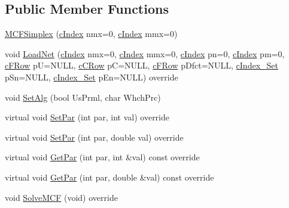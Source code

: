 \subsection*{Public Member Functions}
\begin{DoxyCompactItemize}
\item 
\mbox{\hyperlink{class_m_c_f_simplex_abff4293726e37f6e979cf7c156514e0f}{M\+C\+F\+Simplex}} (\mbox{\hyperlink{class_m_c_f_class_a76aaabb20535c51a2752b93f6c38fe54}{c\+Index}} nmx=0, \mbox{\hyperlink{class_m_c_f_class_a76aaabb20535c51a2752b93f6c38fe54}{c\+Index}} mmx=0)
\item 
void \mbox{\hyperlink{class_m_c_f_simplex_ac270d18d58fd6fe88164cde1f4c80aff}{Load\+Net}} (\mbox{\hyperlink{class_m_c_f_class_a76aaabb20535c51a2752b93f6c38fe54}{c\+Index}} nmx=0, \mbox{\hyperlink{class_m_c_f_class_a76aaabb20535c51a2752b93f6c38fe54}{c\+Index}} mmx=0, \mbox{\hyperlink{class_m_c_f_class_a76aaabb20535c51a2752b93f6c38fe54}{c\+Index}} pn=0, \mbox{\hyperlink{class_m_c_f_class_a76aaabb20535c51a2752b93f6c38fe54}{c\+Index}} pm=0, \mbox{\hyperlink{class_m_c_f_class_ad325f3193dbba0ddef1da4e72d29eda6}{c\+F\+Row}} pU=N\+U\+LL, \mbox{\hyperlink{class_m_c_f_class_ab700102e9ba8bb6015be6818d4e99097}{c\+C\+Row}} pC=N\+U\+LL, \mbox{\hyperlink{class_m_c_f_class_ad325f3193dbba0ddef1da4e72d29eda6}{c\+F\+Row}} p\+Dfct=N\+U\+LL, \mbox{\hyperlink{class_m_c_f_class_a81575b2d4e4d5636b17170432150ae69}{c\+Index\+\_\+\+Set}} p\+Sn=N\+U\+LL, \mbox{\hyperlink{class_m_c_f_class_a81575b2d4e4d5636b17170432150ae69}{c\+Index\+\_\+\+Set}} p\+En=N\+U\+LL) override
\item 
void \mbox{\hyperlink{class_m_c_f_simplex_a1d66ff221305ac6731b32eaec7625a74}{Set\+Alg}} (bool Us\+Prml, char Whch\+Prc)
\item 
virtual void \mbox{\hyperlink{class_m_c_f_simplex_aebda2a23b313bb3ab143e66137ada924}{Set\+Par}} (int par, int val) override
\item 
virtual void \mbox{\hyperlink{class_m_c_f_simplex_ae6eb12cc8e2e124b236bf84ebeddab70}{Set\+Par}} (int par, double val) override
\item 
virtual void \mbox{\hyperlink{class_m_c_f_simplex_aebb293732f2fd2767e9ebc5e8ccae338}{Get\+Par}} (int par, int \&val) const override
\item 
virtual void \mbox{\hyperlink{class_m_c_f_simplex_a56cd6bb7b0a08a99f6acc82ef4bb4e9b}{Get\+Par}} (int par, double \&val) const override
\item 
void \mbox{\hyperlink{class_m_c_f_simplex_aea7d742cb19c17b17fb0832ea74cdb21}{Solve\+M\+CF}} (void) override

\end{DoxyCompactItemize}
